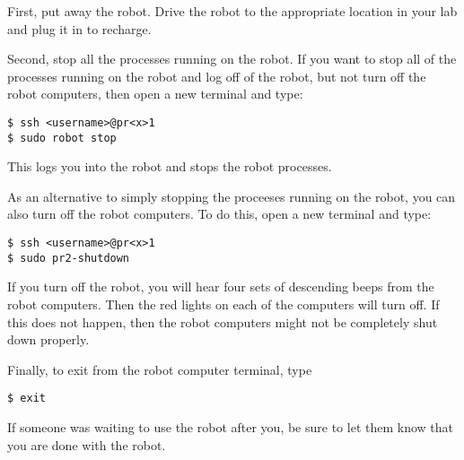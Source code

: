 First, put away the robot. Drive the robot to the appropriate location in your lab and plug it in to recharge.

Second, stop all the processes running on the robot. If you want to stop all of the processes running on the robot and log off of the robot, but not turn off the robot computers, then open a new terminal and type:
\begin{verbatim}
$ ssh <username>@pr<x>1
$ sudo robot stop
\end{verbatim}
This logs you into the robot and stops the robot processes.

As an alternative to simply stopping the proceeses running on the robot, you can also turn off the robot computers. To do this, open a new terminal and type:
\begin{verbatim}
$ ssh <username>@pr<x>1
$ sudo pr2-shutdown
\end{verbatim}

If you turn off the robot, you will hear four sets of descending beeps from the robot computers. Then the red lights on each of the computers will turn off. If this does not happen, then the robot computers might not be completely shut down properly.

Finally, to exit from the robot computer terminal, type
\begin{verbatim}
$ exit
\end{verbatim}

If someone was waiting to use the robot after you, be sure to let them know that you are done with the robot.
